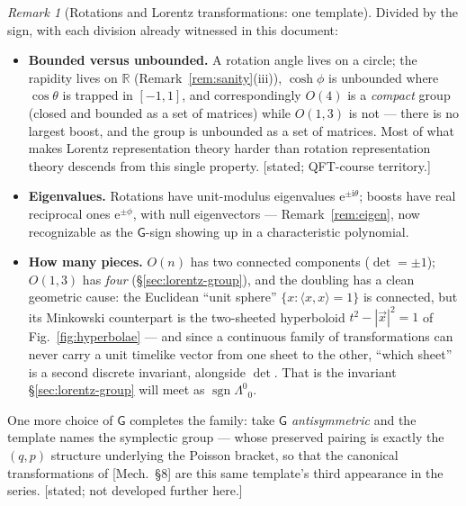\documentclass[11pt]{article}
\theoremstyle{plain}
\theoremstyle{definition}
\theoremstyle{remark}
\newtheorem{remark}[theorem]{Remark}
\newcommand{\ee}{\mathrm{e}}
\newcommand{\ii}{\mathrm{i}}
\newcommand{\R}{\mathbb{R}}
\newcommand{\vx}{\vec{x}}
\begin{document}
\begin{remark}[Rotations and Lorentz transformations: one template]
Divided by the sign, with each division already witnessed in this
document:
\begin{itemize}
  \item \textbf{Bounded versus unbounded.} A rotation angle lives on
  a circle; the rapidity lives on $\R$
  (Remark~\ref{rem:sanity}(iii)), $\cosh\phi$ is unbounded where
  $\cos\theta$ is trapped in $[-1,1]$, and correspondingly $O(4)$ is
  a \emph{compact} group (closed and bounded as a set of matrices)
  while $O(1,3)$ is not --- there is no largest boost, and the group
  is unbounded as a set of matrices. Most of what makes Lorentz
  representation theory harder than rotation representation theory
  descends from this single property. [stated; QFT-course territory.]
  \item \textbf{Eigenvalues.} Rotations have unit-modulus eigenvalues
  $\ee^{\pm\ii\theta}$; boosts have real reciprocal ones
  $\ee^{\pm\phi}$, with null eigenvectors ---
  Remark~\ref{rem:eigen}, now recognizable as the $\mathsf G$-sign
  showing up in a characteristic polynomial.
  \item \textbf{How many pieces.} $O(n)$ has two connected components
  ($\det = \pm1$); $O(1,3)$ has \emph{four}
  (\S\ref{sec:lorentz-group}), and the doubling has a clean geometric
  cause: the Euclidean ``unit sphere'' $\{x : \langle x,x\rangle = 1\}$
  is connected, but its Minkowski counterpart is the two-sheeted
  hyperboloid $t^2 - |\vx|^2 = 1$ of Fig.~\ref{fig:hyperbolae} ---
  and since a continuous family of transformations can never carry a
  unit timelike vector from one sheet to the other, ``which sheet''
  is a second discrete invariant, alongside $\det$. That is the
  invariant \S\ref{sec:lorentz-group} will meet as
  $\operatorname{sgn}\Lambda^0{}_0$.
\end{itemize}
One more choice of $\mathsf G$ completes the family: take $\mathsf G$
\emph{antisymmetric} and the template names the symplectic group ---
whose preserved pairing is exactly the $(q, p)$ structure underlying
the Poisson bracket, so that the canonical transformations of
[Mech.\ \S8] are this same template's third appearance in the series.
[stated; not developed further here.]
\end{remark}
\end{document}
